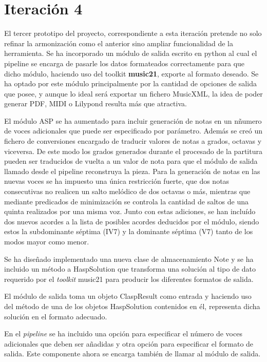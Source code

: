 \section{Iteración 4}

El tercer prototipo del proyecto, correspondiente a esta iteración pretende no solo refinar la armonización como el anterior sino ampliar funcionalidad de la herramienta. Se ha incorporado un módulo de salida escrito en python al cual el pipeline se encarga de pasarle los datos formateados correctamente para que dicho módulo, haciendo uso del toolkit \textbf{music21}, exporte al formato deseado. Se ha optado por este módulo principalmente por la cantidad de opciones de salida que posee, y aunque lo ideal será exportar un fichero MusicXML, la idea de poder generar PDF, MIDI o Lilypond resulta más que atractiva.

El módulo ASP se ha aumentado para incluir generación de notas en un nñumero de voces adicionales que puede ser especificado por parámetro. Además se creó un fichero de conversiones encargado de traducir valores de notas a grados, octavas y viceversa. De este modo los grados generados durante el procesado de la partitura pueden ser traducidos de vuelta a un valor de nota para que el módulo de salida llamado desde el pipeline reconstruya la pieza. Para la generación de notas en las nuevas voces se ha impuesto una única restricción fuerte, que dos notas consecutivas no realicen un salto melódico de dos octavas o más, mientras que mediante predicados de minimización se controla la cantidad de saltos de una quinta realizados por una misma voz. Junto con estas adiciones, se han incluído dos nuevos acordes a la lista de posibles acordes deducidos por el módulo, siendo estos la subdominante séptima (IV7) y la dominante séptima (V7) tanto de los modos mayor como menor.

Se ha diseñado implementado una nueva clase de almacenamiento Note y se ha incluido un método a HaspSolution que transforma una solución al tipo de dato requerido por el \textit{toolkit} music21 para producir los diferentes formatos de salida.

El módulo de salida toma un objeto ClaspResult como entrada y haciendo uso del método de una de los objetos HaspSolution contenidos en él, representa dicha solución en el formato adecuado.

En el \textit{pipeline} se ha incluido una opción para especificar el número de voces adicionales que deben ser añadidas y otra opción para especificar el formato de salida. Este componente ahora se encarga también de llamar al módulo de salida.

